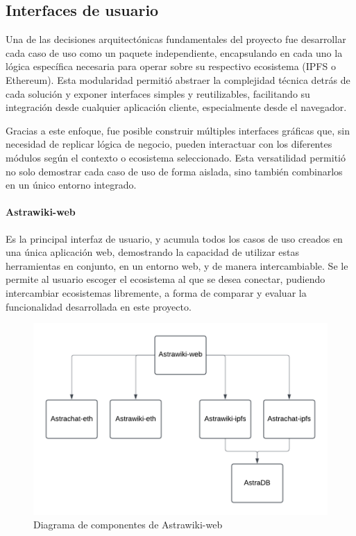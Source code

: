 \subsection{Interfaces de usuario}

Una de las decisiones arquitectónicas fundamentales del proyecto fue desarrollar cada caso de uso como un paquete independiente, encapsulando en cada uno la lógica específica necesaria para operar sobre su respectivo ecosistema (IPFS o Ethereum). Esta modularidad permitió abstraer la complejidad técnica detrás de cada solución y exponer interfaces simples y reutilizables, facilitando su integración desde cualquier aplicación cliente, especialmente desde el navegador.

Gracias a este enfoque, fue posible construir múltiples interfaces gráficas que, sin necesidad de replicar lógica de negocio, pueden interactuar con los diferentes módulos según el contexto o ecosistema seleccionado. Esta versatilidad permitió no solo demostrar cada caso de uso de forma aislada, sino también combinarlos en un único entorno integrado.

\paragraph{Astrawiki-web}

Es la principal interfaz de usuario, y acumula todos los casos de uso creados en una única aplicación web, demostrando la capacidad de utilizar estas herramientas en conjunto, en un entorno web, y de manera intercambiable. Se le permite al usuario escoger el ecosistema al que se desea conectar, pudiendo intercambiar ecosistemas libremente, a forma de comparar y evaluar la funcionalidad desarrollada en este proyecto.

\begin{figure}[H]
    \centering
    \includegraphics[width=0.8\linewidth]{img/frontends/arquitectura-astrawiki-web.png}
    \caption{Diagrama de componentes de Astrawiki-web}
    \label{fig:arquitectura-astrawiki-web}
\end{figure}

